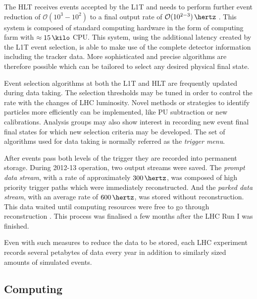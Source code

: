 The \gls{HLT} receives events accepted by the \gls{L1T} and needs to perform further event reduction of 
$\mathcal{O}(10^{3}-10^{2})$ to a final output rate of $\mathcal{O}(10^{2-3})\,\hertz$ . This system is composed of standard computing hardware in the form of computing farm with $\approx 15\,\kilo$ \gls{CPU}. This system, using the additional latency created by the \gls{L1T} event selection, is able to make use of the complete detector information including the tracker data. More sophisticated and precise algorithms are therefore possible which can be tailored to select any desired physical final state. 

Event selection algorithms at both the \gls{L1T} and \gls{HLT} are frequently updated during data taking. The selection thresholds may be tuned in order to control the rate with the changes of \gls{LHC} luminosity. Novel methods or strategies to identify particles more efficiently can be implemented, like \gls{PU} subtraction or new calibrations. Analysis groups may also show interest in recording new event final final states for which new selection criteria may be developed. The set of algorithms used for data taking is normally referred as the \textit{trigger menu}. 

After events pass both levels of the trigger they are recorded into permanent storage. During 2012-13 operation, two output streams were saved. The \textit{prompt data stream}, with a rate of approximately $300\,\hertz$, was composed of high priority trigger paths which were immediately reconstructed. And the \textit{parked data stream}, with an average rate of $600\,\hertz$, was stored without reconstruction. This data waited until computing resources were  free to go through reconstruction \cite{ARTICLE:CMSDataParking}. This process was finalised a few months after the \gls{LHC} Run I was finished.

Even with such measures to reduce the data to be stored, each \gls{LHC} experiment records several petabytes of data every year in addition to similarly sized amounts of simulated events.

\subsection{Computing}
\label{SUBSECTION:ExperimentalApparatus_CMS_Computing}

